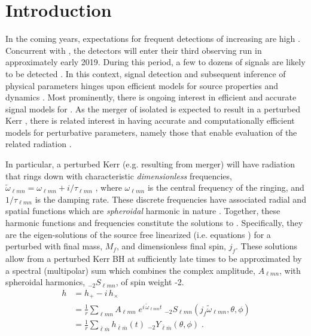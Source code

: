 \documentclass[twocolumn,aps,prd,floatfix,preprintnumbers,a4paper,nofootinbib,
superscriptaddress,10pt]{revtex4-1}
\newcommand{\cw}{\tilde{\omega}}
\def\jf{j_f}
\def\mf{M_f}
\def\lmn{_{\ell m n}}
\def\LM{_{\bar{\ell} \bar{m}}}
\begin{document}
\section{Introduction}
%
In the coming years, expectations for frequent \gw{} detections of increasing \snr{} are high \cite{TheLIGOScientific:2016pea,Abbott:2016nhf,LIGOScientific:2018mvr}.
%
Concurrent with \virgo{}, the \aligo{} detectors will enter their third observing run in approximately early 2019.
%
During this period, a few to dozens of \bbh{} signals are likely to be detected \cite{Abbott:2016nhf,Abbott2018OS}.
%
In this context, signal detection and subsequent inference of physical parameters hinges upon efficient models for source properties and dynamics \cite{Abbott:2016wiq,TheLIGOScientific:2016wfe}.
%
Most prominently, there is ongoing interest in efficient and accurate signal models for \bbh{} \imr{} \cite{Blackman:2017dfb, London:2017bcn, Hannam:2013oca, Varma:2018mmi, Pan:2013rra, Cotesta:2018fcv}.
%
As the merger of isolated  is expected to result in a perturbed Kerr \bh{}, there is related interest in having accurate and computationally efficient models for perturbative parameters, namely those that enable evaluation of the related \rd{} radiation \cite{Berti:2005ys}.
%
\par In particular, a perturbed Kerr \bh{} (e.g. resulting from \bbh{} merger) will have \gw{} radiation that rings down with characteristic \textit{dimensionless} frequencies,
%
$%
	\cw\lmn = \omega\lmn + i/\tau\lmn
$%
, where $\omega\lmn$ is the central frequency of the ringing, and $1/\tau\lmn$ is the damping rate.
%
These discrete frequencies have associated radial and spatial functions which are \textit{spheroidal} harmonic in nature \cite{Leaver85}.
%
Together, these harmonic functions and frequencies constitute the \qnm{} solutions to \ee{}.
%
Specifically, they are the eigen-solutions of the source free linearized \ee{} (i.e.  equations \cite{PhysRevLett.29.1114}) for a perturbed \bh{} with final mass, $\mf$, and dimensionless final spin, $\jf$.
%
These solutions allow \grad{} from a perturbed Kerr BH at sufficiently late times to be approximated by a spectral (multipolar) sum which combines the complex \qnm{} amplitude, $A\lmn$, with spheroidal harmonics, $_{-2}S\lmn$, of spin weight -2.
%
\begin{align}
	\label{hrd}
	h &= h_{+} - i \, h_{\times}
	  \\ \nonumber
	  &= \frac{1}{r} \sum\lmn A\lmn \; e^{i\,\cw\lmn t} \; _{-2}S\lmn( \jf \cw\lmn,\theta,\phi)
		\\ \nonumber
		&= \frac{1}{r} \sum\LM h\LM(t) \; _{-2}Y\LM(\theta,\phi) \;  .
\end{align}
\end{document}
